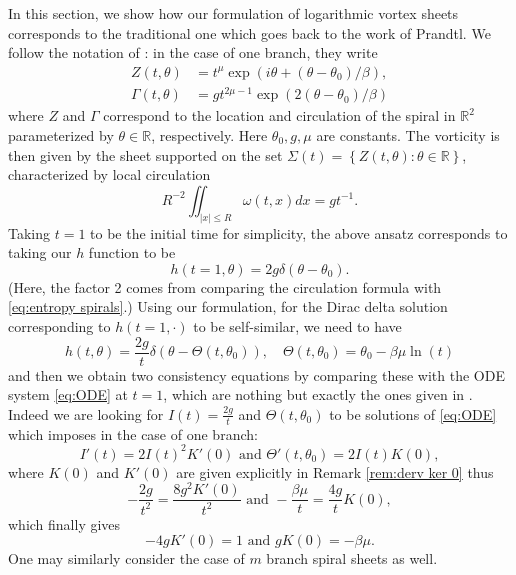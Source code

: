 \documentclass[10pt]{article}
\theoremstyle{definition}
\theoremstyle{remark}
\numberwithin{equation}{section}
\newcommand{\0}{\emptyset}
\newcommand{\bt}{\beta}
\newcommand{\Gmm}{\Gamma}
\newcommand{\dlt}{\delta}
\newcommand{\tht}{\theta}
\newcommand{\omg}{\omega}
\newcommand{\bbR}{\mathbb R}
\begin{document}
   In this section, we show how our formulation of logarithmic vortex sheets corresponds to the traditional one which goes back to the work of Prandtl. We follow the notation of \cite{CKW21,CKW22}: in the case of one branch, they write 
   \begin{equation*}
				\begin{split}
					Z(t,\tht) & = t^{\mu} \exp( i\tht + (\tht-\tht_{0})/\beta), \\
     \Gmm(t,\tht) & = g t^{2\mu - 1} \exp( 2(\tht-\tht_{0})/\beta)
				\end{split}
			\end{equation*} where $Z$ and $\Gmm$ correspond to the location and circulation of the spiral in $\bbR^2$ parameterized by $\tht\in \bbR$, respectively. Here $\tht_{0},g,\mu$ are constants. The vorticity is then given by the sheet supported on the set $\Sigma(t) = \left\{  Z(t,\tht) : \tht \in \bbR \right\} $, characterized by local circulation \begin{equation*}
			    R^{-2}\iint_{|x|\le R} \omg(t,x) dx = gt^{-1}.
			\end{equation*} 
   Taking $t = 1$ to be the initial time for simplicity, the above ansatz corresponds to taking our $h$ function to be \begin{equation*}
       h(t=1,\tht) = 2g \dlt(\tht-\tht_{0}). 
   \end{equation*} (Here, the factor 2 comes from comparing the circulation formula with \eqref{eq:entropy spirals}.) Using our formulation, for the Dirac delta solution corresponding to $h(t=1,\cdot)$ to be self-similar, we need to have \begin{equation*}
       h(t,\tht) = \frac{2g}{t} \dlt(\tht - \Theta(t,\tht_{0})), \quad \Theta(t,\tht_0) = \tht_0 - \bt\mu \ln(t)
   \end{equation*}
   and then we obtain two consistency equations by comparing these with the ODE system \eqref{eq:ODE} at $t=1$, which are nothing but exactly the ones given in \cite[Corollary 1.3]{CKW21}. Indeed we are looking for $I(t)=\frac{2g}{t}$ and $\Theta(t,\theta_0)$ to be solutions of \eqref{eq:ODE} which imposes in the case of one branch:
   \[
   I'(t)=2I(t)^2K'(0) \text{ and } \Theta'(t,\theta_0)=2I(t)K(0),
   \]
   where $K(0)$ and $K'(0)$ are given explicitly in Remark \eqref{rem:derv ker 0} thus 
   \[
   -\frac{2g}{t^2}=\frac{8g^2 K'(0)}{t^2} \text{ and } -\frac{\beta \mu}{t}=\frac{4g}{t}K(0),
   \]
   which finally gives
\[
-4gK'(0)=1 \text{ and }gK(0)=-\beta\mu.
\]
   One may similarly consider the case of $m$ branch spiral sheets as well. 
	
		
		
		
	
\end{document}
